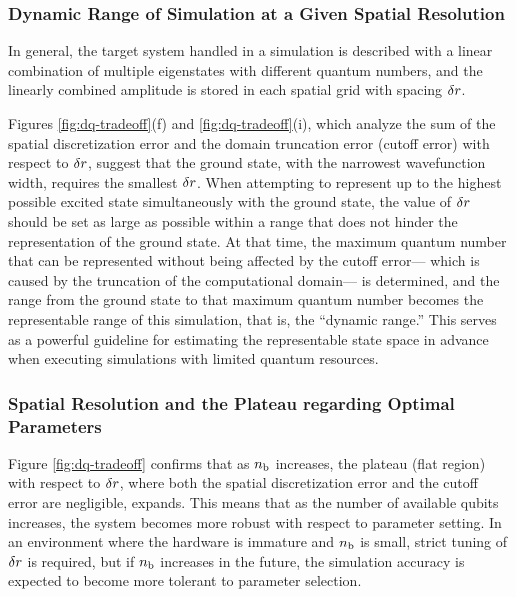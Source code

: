 \documentclass[jctc-draft.tex]{subfiles}
\begin{document}

\subsubsection{Dynamic Range of Simulation at a Given Spatial Resolution}
In general, the target system handled in a simulation is described with a linear
combination of multiple eigenstates with different quantum numbers, and the
linearly combined amplitude is stored in each spatial grid with spacing
$\delta r$.

Figures \ref{fig:dq-tradeoff}(f) and \ref{fig:dq-tradeoff}(i), which analyze the
sum of the spatial discretization error and the domain truncation error (cutoff
error) with respect to $\delta r$, suggest that the ground state, with the
narrowest wavefunction width, requires the smallest $\delta r$. When attempting
to represent up to the highest possible excited state simultaneously with the
ground state, the value of $\delta r$ should be set as large as possible within a
range that does not hinder the representation of the ground state. At that time,
the maximum quantum number that can be represented without being affected by the
cutoff error--- which is caused by the truncation of the computational domain---
is determined, and the range from the ground state to that maximum quantum
number becomes the representable range of this simulation, that is, the
``dynamic range.'' This serves as a powerful guideline for estimating the
representable state space in advance when executing simulations with limited
quantum resources.

\subsubsection{Spatial Resolution and the Plateau regarding Optimal Parameters}
Figure \ref{fig:dq-tradeoff} confirms that as $n_{\mathrm{b}}$ increases, the plateau (flat
region) with respect to $\delta r$, where both the spatial discretization error
and the cutoff error are negligible, expands. This means that as the number of
available qubits increases, the system becomes more robust with respect to
parameter setting. In an environment where the hardware is immature and $n_{\mathrm{b}}$ is
small, strict tuning of $\delta r$ is required, but if $n_{\mathrm{b}}$ increases in the
future, the simulation accuracy is expected to become more tolerant to
parameter selection.
\end{document}
